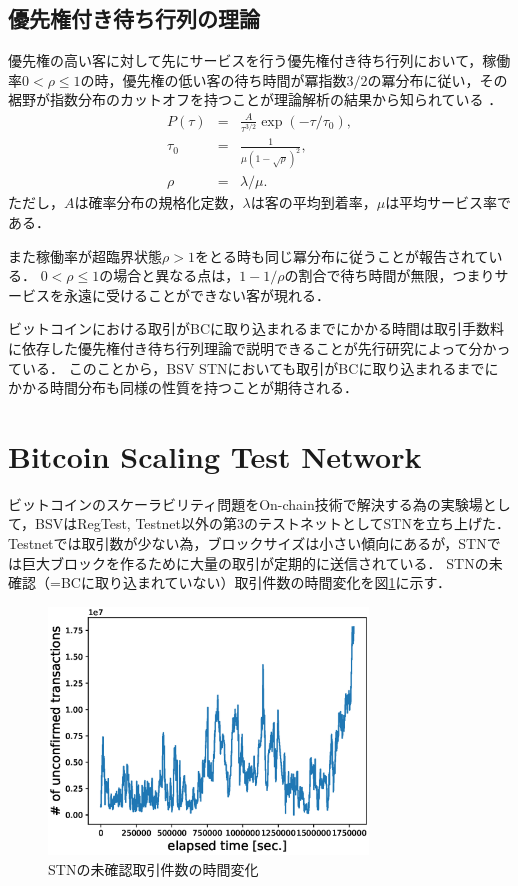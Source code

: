 \documentclass[graybox]{svmult}
\begin{document}
\subsection{優先権付き待ち行列の理論}
\label{sec:priorityqueue}

優先権の高い客に対して先にサービスを行う優先権付き待ち行列において，稼働率$0 < \rho \le 1$の時，優先権の低い客の待ち時間が冪指数$3/2$の冪分布に従い，その裾野が指数分布のカットオフを持つことが理論解析の結果から知られている
\cite{OB2005}．
%
\begin{eqnarray}
  P(\tau) &=& \frac{A}{\tau^{3/2}} \exp(-\tau/\tau_0), \\
  \tau_0  &=& \frac{1}{\mu (1-\sqrt{\rho})^2}, \\
  \rho    &=& \lambda / \mu.
\end{eqnarray}
%
ただし，$A$は確率分布の規格化定数，$\lambda$は客の平均到着率，$\mu$は平均サービス率である．

また稼働率が超臨界状態$\rho > 1$をとる時も同じ冪分布に従うことが報告されている．
$0 < \rho \le 1$の場合と異なる点は，$1-1/\rho$の割合で待ち時間が無限，つまりサービスを永遠に受けることができない客が現れる．

ビットコインにおける取引がBCに取り込まれるまでにかかる時間は取引手数料に依存した優先権付き待ち行列理論で説明できることが先行研究によって分かっている\cite{KK2019}．
このことから，BSV STNにおいても取引がBCに取り込まれるまでにかかる時間分布も同様の性質を持つことが期待される．




\section{Bitcoin Scaling Test Network}
\label{sec:stn}

ビットコインのスケーラビリティ問題をOn-chain技術で解決する為の実験場として，BSVはRegTest, Testnet以外の第3のテストネットとしてSTNを立ち上げた．
Testnetでは取引数が少ない為，ブロックサイズは小さい傾向にあるが，STNでは巨大ブロックを作るために大量の取引が定期的に送信されている．
STNの未確認（=BCに取り込まれていない）取引件数の時間変化を図\ref{fig:unconfirmed_tx}に示す．
%
\begin{figure}[t]
  \vspace{-45mm}
  \begin{center}
    \includegraphics[width=85mm]{time_vs_tx-plot.eps}
  \end{center}
  \vspace{45mm}
  \caption{STNの未確認取引件数の時間変化}
  \label{fig:unconfirmed_tx}
\end{figure}
%
\end{document}
